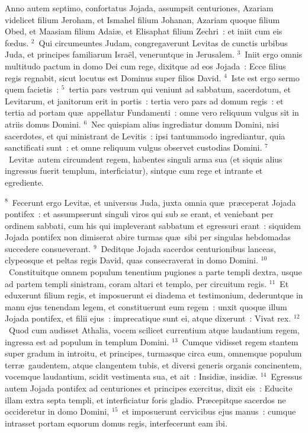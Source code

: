 \bchapter
\lettrine[lines=3,image=true,loversize=0.05,lraise=-0.03]{A}{}nno autem septimo, confortatus Jojada, assumpsit centuriones, Azariam videlicet filium Jeroham, et Ismahel filium Johanan, Azariam quoque filium Obed, et Maasiam filium Adai\ae , et Elisaphat filium Zechri~: et iniit cum eis fœdus.
${}^{2}$~Qui circumeuntes Judam, congregaverunt Levitas de cunctis urbibus Juda, et principes familiarum Isra\"el, veneruntque in Jerusalem.
${}^{3}$~Iniit ergo omnis multitudo pactum in domo Dei cum rege, dixitque ad eos Jojada~: Ecce filius regis regnabit, sicut locutus est Dominus super filios David.
${}^{4}$~Iste est ergo sermo quem facietis~:
${}^{5}$~tertia pars vestrum qui veniunt ad sabbatum, sacerdotum, et Levitarum, et janitorum erit in portis~: tertia vero pars ad domum regis~: et tertia ad portam qu\ae\ appellatur Fundamenti~: omne vero reliquum vulgus sit in atriis domus Domini.
${}^{6}$~Nec quispiam alius ingrediatur domum Domini, nisi sacerdotes, et qui ministrant de Levitis~: ipsi tantummodo ingrediantur, quia sanctificati sunt~: et omne reliquum vulgus observet custodias Domini.
${}^{7}$~Levit\ae\ autem circumdent regem, habentes singuli arma sua (et siquis alius ingressus fuerit templum, interficiatur), sintque cum rege et intrante et egrediente.


${}^{8}$~Fecerunt ergo Levit\ae , et universus Juda, juxta omnia qu\ae\ pr\ae ceperat Jojada pontifex~: et assumpserunt singuli viros qui sub se erant, et veniebant per ordinem sabbati, cum his qui impleverant sabbatum et egressuri erant~: siquidem Jojada pontifex non dimiserat abire turmas qu\ae\ sibi per singulas hebdomadas succedere consueverant.
${}^{9}$~Deditque Jojada sacerdos centurionibus lanceas, clypeosque et peltas regis David, quas consecraverat in domo Domini.
${}^{10}$~Constituitque omnem populum tenentium pugiones a parte templi dextra, usque ad partem templi sinistram, coram altari et templo, per circuitum regis.
${}^{11}$~Et eduxerunt filium regis, et imposuerunt ei diadema et testimonium, dederuntque in manu ejus tenendam legem, et constituerunt eum regem~: unxit quoque illum Jojada pontifex, et filii ejus~: imprecatique sunt ei, atque dixerunt~: Vivat rex.
${}^{12}$~Quod cum audisset Athalia, vocem scilicet currentium atque laudantium regem, ingressa est ad populum in templum Domini.
${}^{13}$~Cumque vidisset regem stantem super gradum in introitu, et principes, turmasque circa eum, omnemque populum terr\ae\ gaudentem, atque clangentem tubis, et diversi generis organis concinentem, vocemque laudantium, scidit vestimenta sua, et ait~: Insidi\ae , insidi\ae .
${}^{14}$~Egressus autem Jojada pontifex ad centuriones et principes exercitus, dixit eis~: Educite illam extra septa templi, et interficiatur foris gladio. Pr\ae cepitque sacerdos ne occideretur in domo Domini,
${}^{15}$~et imposuerunt cervicibus ejus manus~: cumque intrasset portam equorum domus regis, interfecerunt eam ibi.


